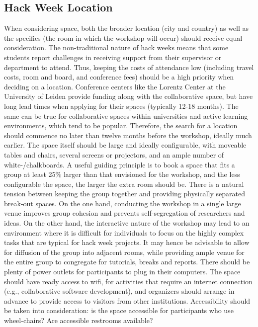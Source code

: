 \documentclass{aastex62}
\begin{document}
\subsection{Hack Week Location}
When considering space, both the broader location (city and country) as well as the specifics (the room in which the workshop will occur) should receive equal consideration. The non-traditional nature of hack weeks means that some students report challenges in receiving support from their supervisor or department to attend. Thus, keeping the costs of attendance low (including travel costs, room and board, and conference fees) should be a high priority when deciding on a location. Conference centers like the Lorentz Center at the University of Leiden provide funding along with the collaborative space, but have long lead times when applying for their spaces (typically 12-18 months). The same can be true for collaborative spaces within universities and active learning environments, which tend to be popular. Therefore, the search for a location should commence no later than twelve months before the workshop, ideally much earlier.
The space itself should be large and ideally configurable, with moveable tables and chairs, several screens or projectors, and an ample number of white-/chalkboards. A useful guiding principle is to book a space that fits a group at least 25\% larger than that envisioned for the workshop, and the less configurable the space, the larger the extra room should be.
There is a natural tension between keeping the group together and providing physically separated break-out spaces. On the one hand, conducting the workshop in a single large venue improves group cohesion and prevents self-segregation of researchers and ideas. On the other hand, the interactive nature of the workshop may lead to an environment where it is difficult for individuals to focus on the highly complex tasks that are typical for hack week projects. It may hence be advisable to allow for diffusion of the group into adjacent rooms, while providing ample venue for the entire group to congregate for tutorials, breaks and reports.
There should be plenty of power outlets for participants to plug in their computers.
The space should have ready access to wifi, for activities that require an internet connection (e.g., collaborative software development), and organizers should arrange in advance to provide access to visitors from other institutions.
Accessibility should be taken into consideration: is the space accessible for participants who use wheel-chairs? Are accessible restrooms available?
\end{document}
